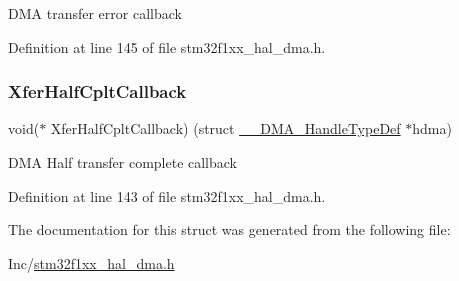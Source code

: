 D\+MA transfer error callback 

Definition at line 145 of file stm32f1xx\+\_\+hal\+\_\+dma.\+h.

\mbox{\label{struct_____d_m_a___handle_type_def_afef2948f0688c22257a540f699e31720}} 
\subsubsection{\texorpdfstring{Xfer\+Half\+Cplt\+Callback}{XferHalfCpltCallback}}
{\footnotesize\ttfamily void($\ast$  Xfer\+Half\+Cplt\+Callback) (struct \hyperlink{struct_____d_m_a___handle_type_def}{\+\_\+\+\_\+\+D\+M\+A\+\_\+\+Handle\+Type\+Def} $\ast$hdma)}

D\+MA Half transfer complete callback 

Definition at line 143 of file stm32f1xx\+\_\+hal\+\_\+dma.\+h.



The documentation for this struct was generated from the following file\+:\begin{DoxyCompactItemize}
\item 
Inc/\hyperlink{stm32f1xx__hal__dma_8h}{stm32f1xx\+\_\+hal\+\_\+dma.\+h}\end{DoxyCompactItemize}
